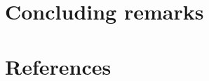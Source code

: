 \documentclass[3p,sort&compress]{elsarticle}
\DeclareRobustCommand{\1}[1]{\ensuremath \mathbbm{1}_{\{#1\}}}
\begin{document}
    \section{Concluding remarks}
%    
    \section*{References}
    
    
\end{document}
